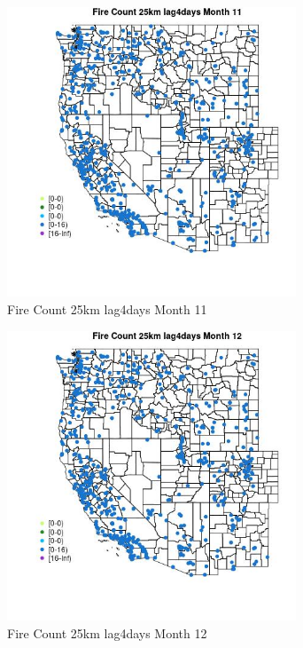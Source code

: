 \begin{figure} 
\centering  
\includegraphics[width=0.77\textwidth]{Code_Outputs/Report_ML_input_PM25_Step4_part_e_de_duplicated_aves_compiled_2019-05-21wNAs_MapObsMo11Fire_Count_25km_lag4days.jpg} 
\caption{\label{fig:Report_ML_input_PM25_Step4_part_e_de_duplicated_aves_compiled_2019-05-21wNAsMapObsMo11Fire_Count_25km_lag4days}Fire Count 25km lag4days Month 11} 
\end{figure} 
 

\begin{figure} 
\centering  
\includegraphics[width=0.77\textwidth]{Code_Outputs/Report_ML_input_PM25_Step4_part_e_de_duplicated_aves_compiled_2019-05-21wNAs_MapObsMo12Fire_Count_25km_lag4days.jpg} 
\caption{\label{fig:Report_ML_input_PM25_Step4_part_e_de_duplicated_aves_compiled_2019-05-21wNAsMapObsMo12Fire_Count_25km_lag4days}Fire Count 25km lag4days Month 12} 
\end{figure} 
 

